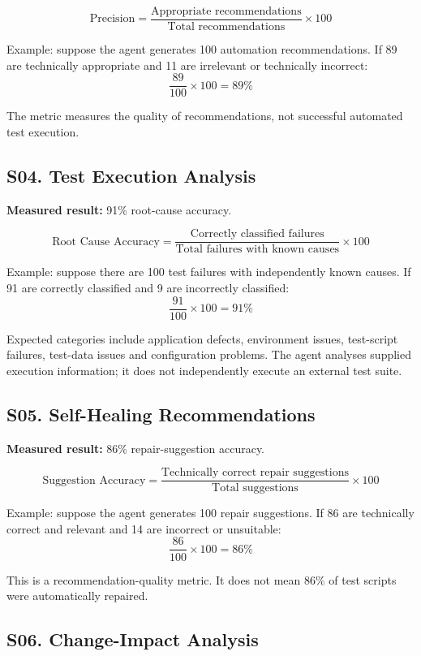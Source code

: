 \documentclass[11pt,a4paper]{article}
\begin{document}
\[
\text{Precision} =
\frac{\text{Appropriate recommendations}}
     {\text{Total recommendations}}\times 100
\]

Example: suppose the agent generates 100 automation recommendations. If 89 are technically appropriate and 11 are irrelevant or technically incorrect:
\[
\frac{89}{100}\times 100=89\%
\]

The metric measures the quality of recommendations, not successful automated test execution.

\subsection{S04. Test Execution Analysis}

\textbf{Measured result:} 91\% root-cause accuracy.

\[
\text{Root Cause Accuracy} =
\frac{\text{Correctly classified failures}}
     {\text{Total failures with known causes}}\times 100
\]

Example: suppose there are 100 test failures with independently known causes. If 91 are correctly classified and 9 are incorrectly classified:
\[
\frac{91}{100}\times 100=91\%
\]

Expected categories include application defects, environment issues, test-script failures, test-data issues and configuration problems. The agent analyses supplied execution information; it does not independently execute an external test suite.

\subsection{S05. Self-Healing Recommendations}

\textbf{Measured result:} 86\% repair-suggestion accuracy.

\[
\text{Suggestion Accuracy} =
\frac{\text{Technically correct repair suggestions}}
     {\text{Total suggestions}}\times 100
\]

Example: suppose the agent generates 100 repair suggestions. If 86 are technically correct and relevant and 14 are incorrect or unsuitable:
\[
\frac{86}{100}\times 100=86\%
\]

This is a recommendation-quality metric. It does not mean 86\% of test scripts were automatically repaired.

\subsection{S06. Change-Impact Analysis}
\end{document}

